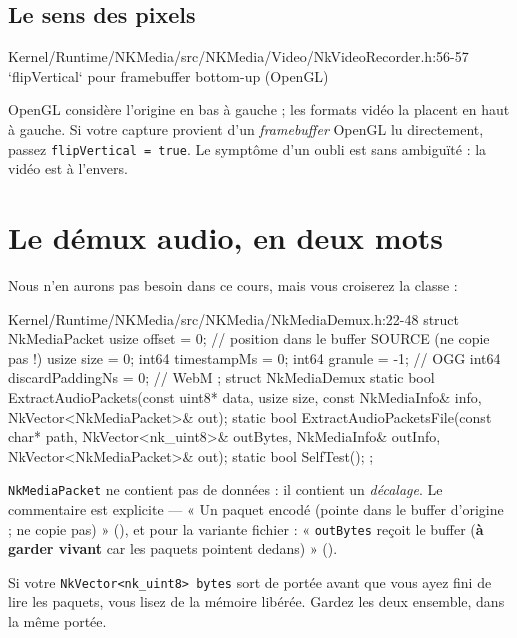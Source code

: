 \subsection{Le sens des pixels}

\begin{nkcode}{Kernel/Runtime/NKMedia/src/NKMedia/Video/NkVideoRecorder.h:56-57}
 `flipVertical` pour framebuffer bottom-up (OpenGL)
\end{nkcode}

OpenGL considère l'origine en bas à gauche ; les formats vidéo la placent en
haut à gauche. Si votre capture provient d'un \emph{framebuffer} OpenGL lu
directement, passez \texttt{flipVertical = true}. Le symptôme d'un oubli est
sans ambiguïté : la vidéo est à l'envers.

\section{Le démux audio, en deux mots}

Nous n'en aurons pas besoin dans ce cours, mais vous croiserez la classe :

\begin{nkcode}{Kernel/Runtime/NKMedia/src/NKMedia/NkMediaDemux.h:22-48}
struct NkMediaPacket {
        usize offset = 0;   // position dans le buffer SOURCE (ne copie pas !)
        usize size = 0;
        int64 timestampMs = 0;
        int64 granule = -1;             // OGG
        int64 discardPaddingNs = 0;     // WebM
};
struct NkMediaDemux {
        static bool ExtractAudioPackets(const uint8* data, usize size, const NkMediaInfo& info,
                                        NkVector<NkMediaPacket>& out);
        static bool ExtractAudioPacketsFile(const char* path, NkVector<nk_uint8>& outBytes,
                                            NkMediaInfo& outInfo, NkVector<NkMediaPacket>& out);
        static bool SelfTest();
};
\end{nkcode}

\begin{nkpiege}
\texttt{NkMediaPacket} ne contient pas de données : il contient un
\emph{décalage}. Le commentaire est explicite — « Un paquet encodé (pointe dans
le buffer d'origine ; ne copie pas) » (), et pour la
variante fichier : « \texttt{outBytes} reçoit le buffer (\textbf{à garder
vivant} car les paquets pointent dedans) » ().

Si votre \texttt{NkVector<nk\_uint8> bytes} sort de portée avant que vous ayez
fini de lire les paquets, vous lisez de la mémoire libérée. Gardez les deux
ensemble, dans la même portée.
\end{nkpiege}

